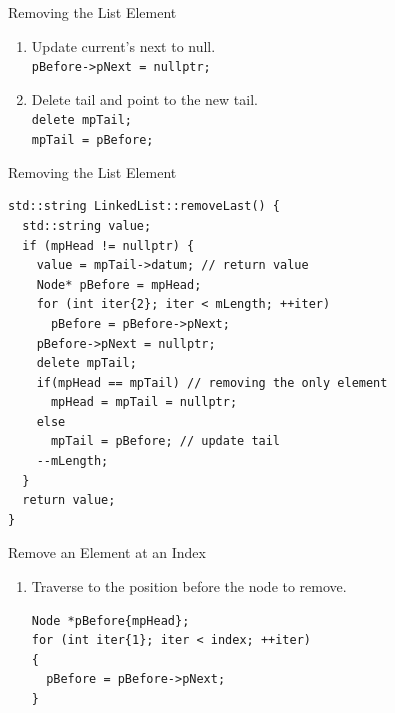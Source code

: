 \documentclass[14pt,aspectratio=1610, hyperref={pdfpagelayout=SinglePage}]{beamer}
\begin{document}
\begin{frame}[fragile, b]{Removing the List Element}
\begin{enumerate}\addtocounter{enumi}{1}
\item Update current's next to null.\\
  \lstinline{pBefore->pNext = nullptr;}\\[1em]
\item<3-> Delete tail and point to the new tail.\\
  \lstinline{delete mpTail;}\\
  \lstinline{mpTail = pBefore;}\\[1em]
\end{enumerate}

\begin{center}
\end{center}
\vspace{1em}
\end{frame}

\begin{frame}[fragile]{Removing the List Element}
\begin{lstlisting}[basicstyle=\small\ttfamily]
std::string LinkedList::removeLast() {
  std::string value;
  if (mpHead != nullptr) {
    value = mpTail->datum; // return value
    Node* pBefore = mpHead;
    for (int iter{2}; iter < mLength; ++iter)
      pBefore = pBefore->pNext;
    pBefore->pNext = nullptr;
    delete mpTail;
    if(mpHead == mpTail) // removing the only element
      mpHead = mpTail = nullptr;
    else
      mpTail = pBefore; // update tail
    --mLength;
  }
  return value;
}
\end{lstlisting}
\end{frame}

\begin{frame}[fragile, b]{Remove an Element at an Index}
\begin{enumerate}
\item Traverse to the position before the node to remove.\\
\begin{lstlisting}
Node *pBefore{mpHead};
for (int iter{1}; iter < index; ++iter)
{
  pBefore = pBefore->pNext;
}
\end{lstlisting}
\end{enumerate}
  \vspace{1.5em}
\end{frame}
\end{document}
